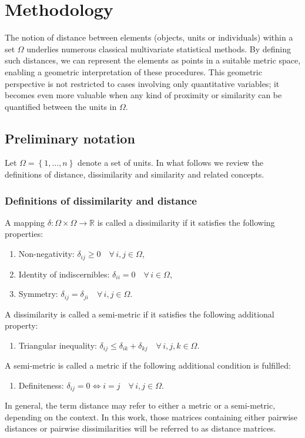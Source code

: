 \section{Methodology}
\label{sec.methodology}

The notion of distance between elements (objects, units or individuals) within a set $\Omega$ underlies numerous classical multivariate statistical methods. By defining such distances, we can represent the elements as points in a suitable metric space, enabling a geometric interpretation of these procedures.
This geometric perspective is not restricted to cases involving only quantitative variables; it becomes even more valuable when any kind of proximity or similarity can be quantified between the units in $\Omega$.

\subsection{Preliminary notation}

Let $\Omega = \left\{ 1, \dots, n \right\}$ denote a set of units. In what follows we review the definitions of distance, dissimilarity and similarity and related concepts.

\subsubsection{Definitions of dissimilarity and distance}
\label{sec.def.dist}

A mapping $\delta : \Omega \times \Omega \rightarrow \mathbb{R}$ is called a dissimilarity if it satisfies the following properties:
\begin{enumerate}
\item[(i)] Non-negativity: $\delta_{ij} \geq 0 \quad \forall\, i, j \in \Omega$, 
\item[(ii)] Identity of indiscernibles: $\delta_{ii} = 0 \quad \forall\, i \in \Omega$, 
\item[(iii)] Symmetry: $\delta_{ij} = \delta_{ji} \quad \forall\, i, j \in \Omega$.
\end{enumerate}
A dissimilarity is called a semi-metric if it satisfies the following additional property:
\begin{enumerate}
\item[(iv)] Triangular inequality: $\delta_{ij} \leq \delta_{ik} + \delta_{kj} \quad \forall\, i, j, k \in \Omega$.
\end{enumerate}
A semi-metric is called a metric if the following additional condition is fulfilled:
\begin{enumerate}
\item[(v)] Definiteness: $\delta_{ij} = 0 \iff i = j \quad \forall\, i, j \in \Omega$.
\end{enumerate}
In general, the term distance may refer to either a metric or a semi-metric, depending on the context. In this work, those matrices containing either pairwise distances or pairwise dissimilarities will be referred to as distance matrices.


